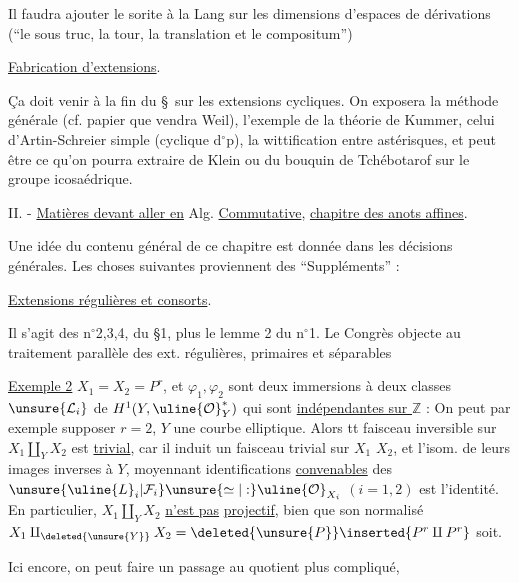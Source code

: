Il faudra ajouter le sorite à la Lang sur les dimensions d'espaces de dérivations (``le sous truc, la tour, la translation et le compositum'')

\uline{Fabrication d'extensions}.

Ça doit venir à la fin du \S\ sur les extensions cycliques. On exposera la méthode générale (cf. papier que vendra Weil), l'exemple de la théorie de Kummer, celui d'Artin-Schreier simple (cyclique d$^\circ$p), la wittification entre astérisques, et peut être ce qu'on pourra extraire de Klein ou du bouquin de Tchébotarof sur le groupe icosaédrique.

II. - \uline{Matières devant aller en} Alg. \uline{Commutative}, \uline{chapitre des anots affines}.

Une idée du contenu général de ce chapitre est donnée dans les décisions générales. Les choses suivantes proviennent des ``Suppléments'' :

\uline{Extensions régulières et consorts}.

Il s'agit des n$^\circ$2,3,4, du \S1, plus le lemme 2 du n$^\circ$1. Le Congrès objecte au traitement parallèle des ext. régulières, primaires et séparables


\uline{Exemple 2}  $X_1=X_2=P^r$, et $\varphi_1,\varphi_2$ sont deux  immersions  à deux  classes $\unsure{\mathcal L_i}$ de $H^1(Y,\uline{\mathcal O}_Y^*)$  qui sont \uline{indépendantes sur $\mathbb Z$} : On peut par exemple supposer $r=2$, $Y$ une courbe elliptique. Alors  tt faisceau inversible sur $X_1\amalg_Y X_2$ est \uline{trivial}, car il induit un faisceau trivial sur $X_1$ \deleted{$\unsure{\times}$} $X_2$, et l'isom.  de leurs  images inverses à $Y$, moyennant identifications \uline{convenables} des $\unsure{\uline{L}_i|\mathcal F_i}\unsure{\simeq|:}\uline{\mathcal O}_{X_i}$ $(i=1,2)$ est l'identité. En particulier, $X_1\amalg_Y X_2$ \uline{n'est pas} \uline{projectif}, bien que son normalisé $X_1\amalg_{\deleted{\unsure{Y}}}X_2=\deleted{\unsure{P}}\inserted{P^r\amalg P^r}$ soit.

Ici encore,  on peut faire un passage au quotient plus compliqué,

